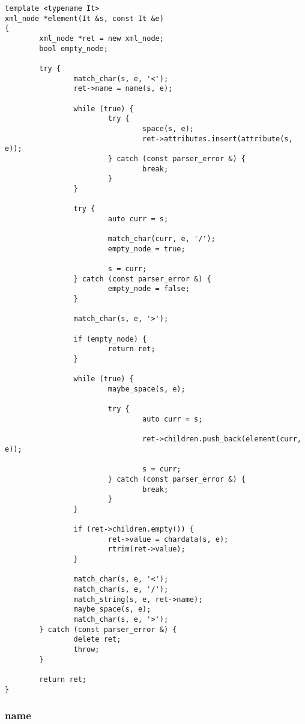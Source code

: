 \documentclass[italian,a4paper]{article}
\begin{document}
\begin{verbatim}
template <typename It>
xml_node *element(It &s, const It &e)
{
        xml_node *ret = new xml_node;
        bool empty_node;

        try {
                match_char(s, e, '<');
                ret->name = name(s, e);

                while (true) {
                        try {
                                space(s, e);
                                ret->attributes.insert(attribute(s, e));
                        } catch (const parser_error &) {
                                break;
                        }
                }

                try {
                        auto curr = s;

                        match_char(curr, e, '/');
                        empty_node = true;

                        s = curr;
                } catch (const parser_error &) {
                        empty_node = false;
                }

                match_char(s, e, '>');

                if (empty_node) {
                        return ret;
                }

                while (true) {
                        maybe_space(s, e);

                        try {
                                auto curr = s;

                                ret->children.push_back(element(curr, e));

                                s = curr;
                        } catch (const parser_error &) {
                                break;
                        }
                }

                if (ret->children.empty()) {
                        ret->value = chardata(s, e);
                        rtrim(ret->value);
                }

                match_char(s, e, '<');
                match_char(s, e, '/');
                match_string(s, e, ret->name);
                maybe_space(s, e);
                match_char(s, e, '>');
        } catch (const parser_error &) {
                delete ret;
                throw;
        }

        return ret;
}
\end{verbatim}

\subsubsection{name}
\end{document}
